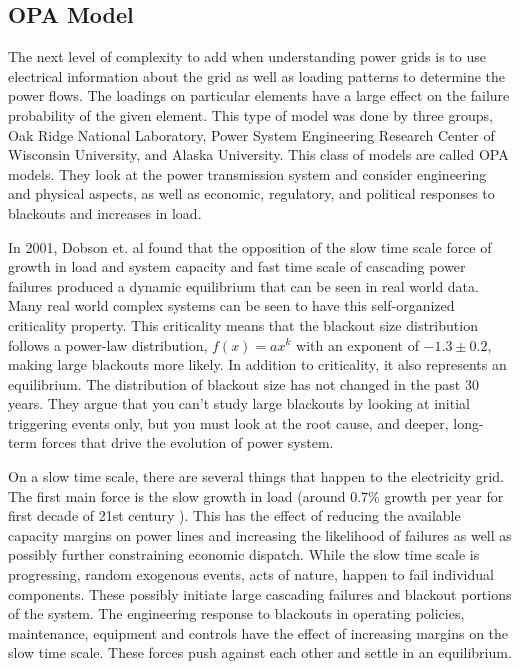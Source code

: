 \subsection{OPA Model}\label{opa_section}

The next level of complexity to add when understanding power grids is to use electrical information about the grid as well as loading patterns to determine the power flows.  The loadings on particular elements have a large effect on the failure probability of the given element.  This type of model was done by three groups, Oak Ridge National Laboratory, Power System Engineering Research Center of Wisconsin University, and Alaska University.  This class of models are called OPA models.  They look at the power transmission system and consider engineering and physical aspects, as well as economic, regulatory, and political responses to blackouts and increases in load.

In 2001, Dobson et. al \cite{dobson_2001} found that the opposition of the slow time scale force of growth in load and system capacity and fast time scale of cascading power failures produced a dynamic equilibrium that can be seen in real world data.  Many real world complex systems can be seen to have this self-organized criticality property.  This criticality means that the blackout size distribution follows a power-law distribution, $f(x) = ax^k$ with an exponent of $-1.3 \pm 0.2$,  making large blackouts more likely.  In addition to criticality, it also represents an equilibrium.  The distribution of blackout size has not changed in the past 30 years.  They argue that you can't study large blackouts by looking at initial triggering events only, but you must look at the root cause, and deeper, long-term forces that drive the evolution of power system.

On a slow time scale, there are several things that happen to the electricity grid.  The first main force is the slow growth in load (around 0.7\% growth per year for first decade of 21st century \cite{eia_gov}).  This has the effect of reducing the available capacity margins on power lines and increasing the likelihood of failures as well as possibly further constraining economic dispatch.  While the slow time scale is progressing, random exogenous events, acts of nature, happen to fail individual components.  These possibly initiate large cascading failures and blackout portions of the system.  The engineering response to blackouts in operating policies, maintenance, equipment and controls have the effect of increasing margins on the slow time scale.  These forces push against each other and settle in an equilibrium.

